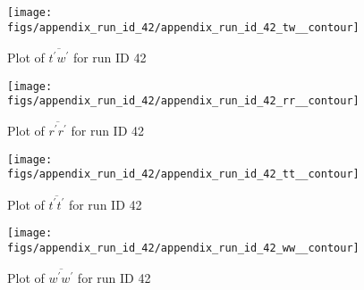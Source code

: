 \begin{figure}[H]
\centering
\texttt{[image: figs/appendix\_run\_id\_42/appendix\_run\_id\_42\_tw\_\_contour]}
\caption{Plot of $\overline{t^\prime w^\prime}$ for run ID 42}
\label{fig:appendix_run_id_42_tw__contour}
\end{figure}


\begin{figure}[H]
\centering
\texttt{[image: figs/appendix\_run\_id\_42/appendix\_run\_id\_42\_rr\_\_contour]}
\caption{Plot of $\overline{r^\prime r^\prime}$ for run ID 42}
\label{fig:appendix_run_id_42_rr__contour}
\end{figure}


\begin{figure}[H]
\centering
\texttt{[image: figs/appendix\_run\_id\_42/appendix\_run\_id\_42\_tt\_\_contour]}
\caption{Plot of $\overline{t^\prime t^\prime}$ for run ID 42}
\label{fig:appendix_run_id_42_tt__contour}
\end{figure}


\begin{figure}[H]
\centering
\texttt{[image: figs/appendix\_run\_id\_42/appendix\_run\_id\_42\_ww\_\_contour]}
\caption{Plot of $\overline{w^\prime w^\prime}$ for run ID 42}
\label{fig:appendix_run_id_42_ww__contour}
\end{figure}


